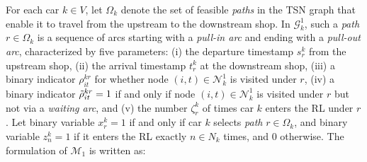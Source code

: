 \documentclass[12pt]{article}
\begin{document}
For each car $k\in V$, let $\Omega_k$ denote the set of feasible \textit{paths} in the TSN graph that enable it to travel from the upstream to the downstream shop. In $\mathcal{G}^1_k$, such a \textit{path} $r\in \Omega_k$ is a sequence of arcs starting with a \textit{pull-in arc} and ending with a \textit{pull-out arc}, characterized by five parameters: \textup{(i)} the departure timestamp $s^k_r$ from the upstream shop, \textup{(ii)} the arrival timestamp $t^k_r$ at the downstream shop, \textup{(iii)} a binary indicator $\rho^{kr}_{it}$ for whether node $(i,t)\in \mathcal{N}^1_k$ is visited under $r$, \textup{(iv)} a binary indicator $\Tilde{\rho}^{kr}_{it}=1$ if and only if node $(i,t)\in \mathcal{N}^1_k$ is visited under $r$ but not via a \textit{waiting arc}, and \textup{(v)} the number $\zeta^k_r$ of times car $k$ enters the RL under $r$. Let binary variable $x^k_r=1$ if and only if car $k$ selects \textit{path} $r\in \Omega_k$, and binary variable $z^k_n=1$ if it enters the RL exactly $n\in N_k$ times, and 0 otherwise. The formulation of $\mathcal{M}_1$ is written as: %
\end{document}
